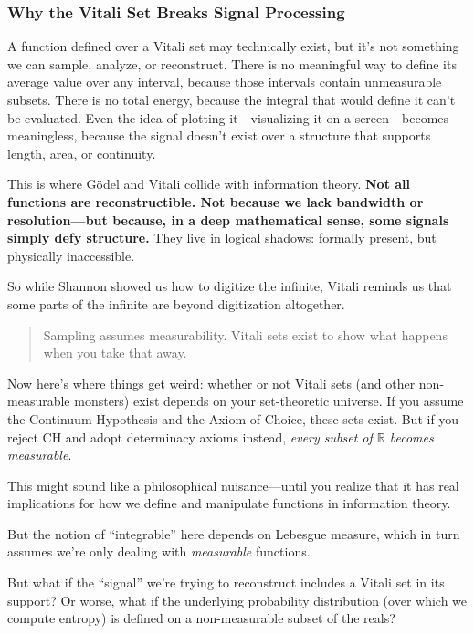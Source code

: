 \vspace{1em}

\subsubsection{Why the Vitali Set Breaks Signal Processing}

A function defined over a Vitali set may technically exist, but it's not something we can sample, analyze, or reconstruct. There is no meaningful way to define its average value over any interval, because those intervals contain unmeasurable subsets. There is no total energy, because the integral that would define it can't be evaluated. Even the idea of plotting it—visualizing it on a screen—becomes meaningless, because the signal doesn't exist over a structure that supports length, area, or continuity.

This is where Gödel and Vitali collide with information theory. \textbf{Not all functions are reconstructible. Not because we lack bandwidth or resolution—but because, in a deep mathematical sense, some signals simply defy structure.} They live in logical shadows: formally present, but physically inaccessible.

So while Shannon showed us how to digitize the infinite, Vitali reminds us that some parts of the infinite are beyond digitization altogether.

\begin{quote}
Sampling assumes measurability. Vitali sets exist to show what happens when you take that away.
\end{quote}

Now here’s where things get weird: whether or not Vitali sets (and other non-measurable monsters) exist depends on your set-theoretic universe. If you assume the Continuum Hypothesis and the Axiom of Choice, these sets exist. But if you reject CH and adopt determinacy axioms instead, \emph{every subset of \(\mathbb{R}\) becomes measurable}.

This might sound like a philosophical nuisance—until you realize that it has real implications for how we define and manipulate functions in information theory.

But the notion of “integrable” here depends on Lebesgue measure, which in turn assumes we’re only dealing with \emph{measurable} functions.

But what if the “signal” we’re trying to reconstruct includes a Vitali set in its support? Or worse, what if the underlying probability distribution (over which we compute entropy) is defined on a non-measurable subset of the reals?


